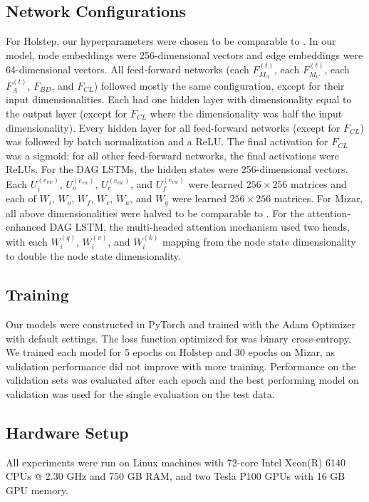 \documentclass{article}
\begin{document}
\subsection{Network Configurations}

For Holstep, our hyperparameters were chosen to be comparable to \cite{wang2017premise}. In our model, node embeddings were 256-dimensional vectors and edge embeddings were 64-dimensional vectors. All feed-forward networks (each $F^{(t)}_{M_A}$, each $F^{(t)}_{M_C}$, each $F^{(t)}_A$, $F_{BD}$, and $F_{CL}$) followed mostly the same configuration, except for their input dimensionalities. Each had one hidden layer with dimensionality equal to the output layer (except for $F_{CL}$ where the dimensionality was half the input dimensionality). Every hidden layer for all feed-forward networks (except for $F_{CL}$) was followed by batch normalization \cite{ioffe2015batch} and a ReLU. The final activation for $F_{CL}$ was a sigmoid; for all other feed-forward networks, the final activations were ReLUs. 
For the DAG LSTMs, the hidden states were 256-dimensional vectors. Each $U^{(e_{vw})}_i$, $U^{(e_{vw})}_o$, $U^{(e_{vw})}_c$, and $U^{(e_{vw})}_f$ were learned $256 \times 256$ matrices and each of $W_i$, $W_o$, $W_f$, $W_c$, $W_a$, and $W_g$ were learned $256 \times 256$ matrices. For Mizar, all above dimensionalities were halved to be comparable to \cite{kucik2018premise,olvsak2019property}. For the attention-enhanced DAG LSTM, the multi-headed attention mechanism used two heads, with each $W^{(q)}_{i}$, $W^{(v)}_{i}$, and $W^{(k)}_{i}$ mapping from the node state dimensionality to double the node state dimensionality.

\subsection{Training}

Our models were constructed in PyTorch \cite{paszke2017automatic} and trained with the Adam Optimizer \cite{kingma2014adam} with default settings. The loss function optimized for was binary cross-entropy. We trained each model for 5 epochs on Holstep and 30 epochs on Mizar, as validation performance did not improve with more training. 
Performance on the validation sets was evaluated after each epoch and the best performing model on validation was used for the single evaluation on the test data.

\subsection{Hardware Setup}

All experiments were run on Linux machines with 72-core Intel Xeon(R) 6140 CPUs @ 2.30 GHz and 750 GB RAM, and two Tesla P100 GPUs with 16 GB GPU memory.

 
\end{document}
